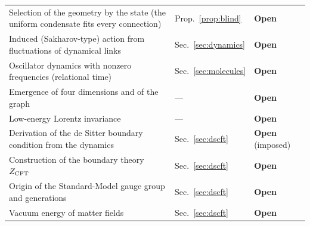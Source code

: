 \documentclass[reprint,aps,prd,amsmath,amssymb,superscriptaddress,nofootinbib,floatfix]{revtex4-2}
\theoremstyle{plain}
\theoremstyle{definition}
\theoremstyle{remark}
\begin{document}
\begin{table}[t]
\begin{ruledtabular}
\begin{tabular}{lll}
\parbox[t]{0.52\textwidth}{\raggedright Selection of the geometry by the state (the uniform condensate fits every connection)\strut} & \parbox[t]{0.17\textwidth}{\raggedright Prop.~\ref{prop:blind}\strut} & \parbox[t]{0.25\textwidth}{\raggedright \textbf{Open}\strut} \\
\parbox[t]{0.52\textwidth}{\raggedright Induced (Sakharov-type) action from fluctuations of dynamical links\strut} & \parbox[t]{0.17\textwidth}{\raggedright Sec.~\ref{sec:dynamics}\strut} & \parbox[t]{0.25\textwidth}{\raggedright \textbf{Open}\strut} \\
\parbox[t]{0.52\textwidth}{\raggedright Oscillator dynamics with nonzero frequencies (relational time)\strut} & \parbox[t]{0.17\textwidth}{\raggedright Sec.~\ref{sec:molecules}\strut} & \parbox[t]{0.25\textwidth}{\raggedright \textbf{Open}\strut} \\
\parbox[t]{0.52\textwidth}{\raggedright Emergence of four dimensions and of the graph\strut} & \parbox[t]{0.17\textwidth}{\raggedright ---\strut} & \parbox[t]{0.25\textwidth}{\raggedright \textbf{Open}\strut} \\
\parbox[t]{0.52\textwidth}{\raggedright Low-energy Lorentz invariance\strut} & \parbox[t]{0.17\textwidth}{\raggedright ---\strut} & \parbox[t]{0.25\textwidth}{\raggedright \textbf{Open}\strut} \\
\parbox[t]{0.52\textwidth}{\raggedright Derivation of the de Sitter boundary condition from the dynamics\strut} & \parbox[t]{0.17\textwidth}{\raggedright Sec.~\ref{sec:dscft}\strut} & \parbox[t]{0.25\textwidth}{\raggedright \textbf{Open} (imposed)\strut} \\
\parbox[t]{0.52\textwidth}{\raggedright Construction of the boundary theory $Z_{\rm CFT}$\strut} & \parbox[t]{0.17\textwidth}{\raggedright Sec.~\ref{sec:dscft}\strut} & \parbox[t]{0.25\textwidth}{\raggedright \textbf{Open}\strut} \\
\parbox[t]{0.52\textwidth}{\raggedright Origin of the Standard-Model gauge group and generations\strut} & \parbox[t]{0.17\textwidth}{\raggedright Sec.~\ref{sec:dscft}\strut} & \parbox[t]{0.25\textwidth}{\raggedright \textbf{Open}\strut} \\
\parbox[t]{0.52\textwidth}{\raggedright Vacuum energy of matter fields\strut} & \parbox[t]{0.17\textwidth}{\raggedright Sec.~\ref{sec:dscft}\strut} & \parbox[t]{0.25\textwidth}{\raggedright \textbf{Open}\strut}
\end{tabular}
\end{ruledtabular}
\end{table}
\end{document}
